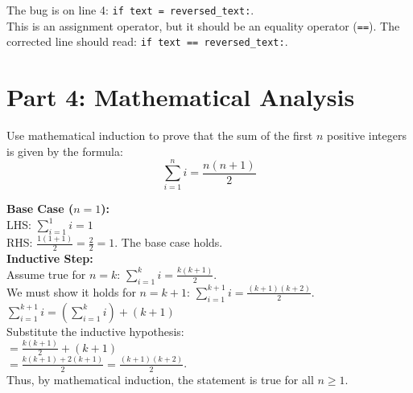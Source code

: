 \documentclass[12pt, answers, addpoints]{exam}
\begin{document}
\begin{questions}
\begin{solution}[1.5in]
    The bug is on line 4: \texttt{if text = reversed\_text:}. \\
    This is an assignment operator, but it should be an equality operator (\texttt{==}). The corrected line should read: \texttt{if text == reversed\_text:}.
\end{solution}


\section*{Part 4: Mathematical Analysis}

\question[15] Use mathematical induction to prove that the sum of the first $n$ positive integers is given by the formula:
$$ \sum_{i=1}^{n} i = \frac{n(n+1)}{2} $$

\begin{solution}[3.5in]
    \textbf{Base Case ($n=1$):} \\
    LHS: $\sum_{i=1}^{1} i = 1$ \\
    RHS: $\frac{1(1+1)}{2} = \frac{2}{2} = 1$. The base case holds. \\[1em]
    \textbf{Inductive Step:} \\
    Assume true for $n=k$: $\sum_{i=1}^{k} i = \frac{k(k+1)}{2}$. \\
    We must show it holds for $n=k+1$: $\sum_{i=1}^{k+1} i = \frac{(k+1)(k+2)}{2}$. \\
    $\sum_{i=1}^{k+1} i = \left(\sum_{i=1}^{k} i\right) + (k+1)$ \\
    Substitute the inductive hypothesis: \\
    $= \frac{k(k+1)}{2} + (k+1)$ \\
    $= \frac{k(k+1) + 2(k+1)}{2} = \frac{(k+1)(k+2)}{2}$. \\
    Thus, by mathematical induction, the statement is true for all $n \geq 1$.
\end{solution}

\end{questions}
\end{document}
